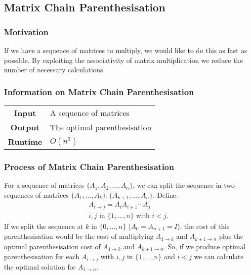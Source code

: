 \documentclass[a4paper, 12pt, twoside]{article}
\begin{document}
\newpage

\subsection{Matrix Chain Parenthesisation}

\subsubsection{Motivation}

If we have a sequence of matrices to multiply, we would like to
do this as fast as possible. By exploiting the associativity of
matrix multiplication we reduce the number of necessary calculations.

\subsubsection{Information on Matrix Chain Parenthesisation}

\begin{center}
      \begin{tabular}{ || c | p{8.5cm} || }
            \hline
                  \textbf{Input} & A sequence of matrices \\
                  \textbf{Output} & The optimal parenthesisation \\
            \hline\hline
                  \textbf{Runtime} & $O(n^3)$ \\
            \hline
      \end{tabular}
\end{center}

\subsubsection{Process of Matrix Chain Parenthesisation}

For a sequence of matrices $\{A_1, A_2, \ldots, A_n\}$, 
we can split the sequence in two sequences of matrices
$\{A_1, \ldots, A_k\}, \{A_{k + 1}, \ldots, A_n\}$. Define:
\begin{gather*}
      A_{i \to j} = A_iA_{i + 1} \cdots A_{j} \\
      i, j \text{ in } \{1, \ldots, n\} \text{ with } i < j.
\end{gather*}
If we split the sequence at $k$ in $\{0, \ldots, n\}$ 
($A_0 = A_{n + 1} = I$), the cost
of this parenthesisation would be the cost of multiplying 
$A_{1 \to k}$ and $A_{k + 1 \to n}$ plus the optimal parenthesisation 
cost of $A_{1 \to k}$ and $A_{k + 1 \to n}$. 
So, if we produce optimal parenthesisation for
each $A_{i \to j}$ with $i, j$ in $\{1, \ldots, n\}$ and $i < j$
we can calculate the optimal solution for $A_{1 \to n}$.
\end{document}
